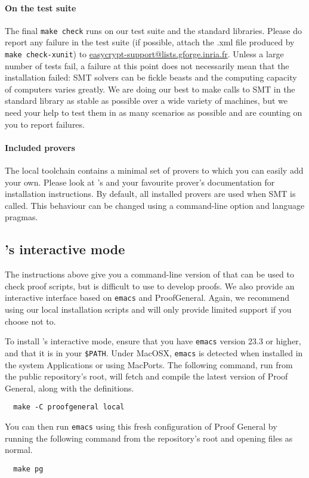 \paragraph{On the test suite}
The final \texttt{make check} runs \EasyCrypt on our test suite and
the standard libraries. Please do report any failure in the test suite
(if possible, attach the .xml file produced by \texttt{make
  check-xunit}) to
\url{easycrypt-support@lists.gforge.inria.fr}. Unless a large number
of tests fail, a failure at this point does not necessarily mean that
the installation failed: SMT solvers can be fickle beasts and the
computing capacity of computers varies greatly. We are doing our best
to make calls to SMT in the standard library as stable as possible
over a wide variety of machines, but we need your help to test them in
as many scenarios as possible and are counting on you to report
failures.

\paragraph{Included provers}
The local toolchain contains a minimal set of provers to which you can easily
add your own. Please look at \WhyThree's and your favourite prover's
documentation for installation instructions. By default, all installed provers
are used when SMT is called. This behaviour can be changed using a command-line
option and language pragmas.

\subsection{\EasyCrypt's interactive mode}
The instructions above give you a command-line version of \EasyCrypt that can be
used to check proof scripts, but is difficult to use to develop proofs. We also
provide an interactive interface based on \texttt{emacs} and ProofGeneral.
Again, we recommend using our local installation scripts and will only provide
limited support if you choose not to.

To install \EasyCrypt's interactive mode, ensure that you have \texttt{emacs}
version 23.3 or higher, and that it is in your \texttt{\$PATH}. Under MacOSX,
\texttt{emacs} is detected when installed in the system Applications or using
MacPorts. The following command, run from the public repository's root, will
fetch and compile the latest version of Proof General, along with the \EasyCrypt
definitions.
\begin{verbatim}
  make -C proofgeneral local
\end{verbatim}
You can then run \texttt{emacs} using this fresh configuration of Proof General
by running the following command from the repository's root and opening files as
normal.
\begin{verbatim}
  make pg
\end{verbatim}

